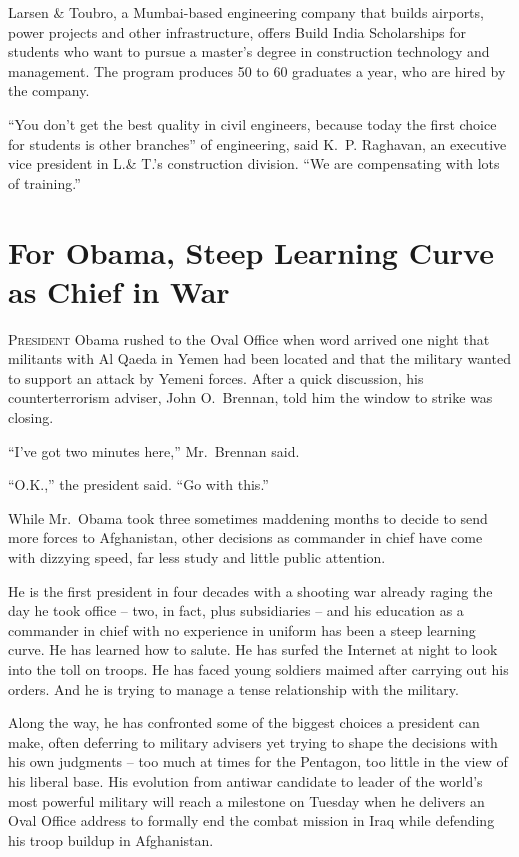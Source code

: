 ﻿\documentclass[12pt]{article}
\begin{document}
Larsen \& Toubro, a Mumbai-based engineering company that builds airports, power projects and other
infrastructure, offers Build India Scholarships for students who want to pursue a master's degree in
construction technology and management. The program produces 50 to 60 graduates a year, who are
hired by the company.

``You don't get the best quality in civil engineers, because today the first choice for students is
other branches'' of engineering, said K.~P. Raghavan, an executive vice president in L.\& T.'s
construction division. ``We are compensating with lots of training.''

\pagebreak
\section{For Obama, Steep Learning Curve as Chief in War}

\lettrine{P}{resident} Obama rushed to the Oval Office when word arrived one
night that militants with Al Qaeda in Yemen had been located and that the military wanted to support
an attack by Yemeni forces. After a quick discussion, his counterterrorism adviser, John O.~Brennan,
told him the window to strike was closing.

``I've got two minutes here,'' Mr.~Brennan said.

``O.K.,'' the president said. ``Go with this.''

While Mr.~Obama took three sometimes maddening months to decide to send more forces to Afghanistan,
other decisions as commander in chief have come with dizzying speed, far less study and little
public attention.

He is the first president in four decades with a shooting war already raging the day he took office
-- two, in fact, plus subsidiaries -- and his education as a commander in chief with no experience
in uniform has been a steep learning curve. He has learned how to salute. He has surfed the Internet
at night to look into the toll on troops. He has faced young soldiers maimed after carrying out his
orders. And he is trying to manage a tense relationship with the military.

Along the way, he has confronted some of the biggest choices a president can make, often deferring
to military advisers yet trying to shape the decisions with his own judgments -- too much at times
for the Pentagon, too little in the view of his liberal base. His evolution from antiwar candidate
to leader of the world's most powerful military will reach a milestone on Tuesday when he delivers
an Oval Office address to formally end the combat mission in Iraq while defending his troop buildup
in Afghanistan.
\end{document}
